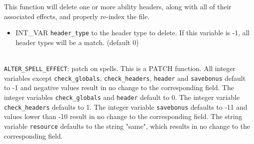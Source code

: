 \documentclass{article}
\begin{document}
This function will delete one or more ability headers, along with all of their associated effects, and properly re-index the file.

\begin{itemize}
\item INT_VAR \verb+header_type+ to the header type to delete. If this variable is -1, all header types will be a match. (default 0)
\end{itemize}
\\

\verb+ALTER_SPELL_EFFECT+: patch  on spells. This is a PATCH function. All integer variables except \verb+check_globals+, \verb+check_headers+, \verb+header+ and \verb+savebonus+ default to -1 and negative values result in no change to the corresponding field. The integer variables \verb+check_globals+ and \verb+header+ default to 0. The integer variable \verb+check_headers+ defaults to 1. The integer variable \verb+savebonus+ defaults to -11 and values lower than -10 result in no change to the corresponding field. The string variable \verb+resource+ defaults to the string "same", which results in no change to the corresponding field.
\end{document}
